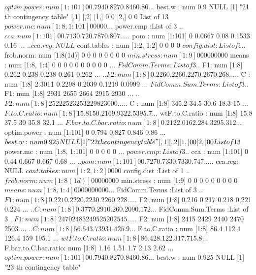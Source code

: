 \documentclass[11pt]{article} %
\begin{document}
\begin{Schunk}
\begin{Soutput}
 $ optim.power         : num [1:101] 0 0.794 0.827 0.846 0.86 ...
 $ best.w              : num 0.9
NULL
[1] "21 th contingency table"
     [,1] [,2]
[1,]    0    0
[2,]    0    0
List of 13
 $ power.mc            : num [1:8, 1:101] 0 0 0 0 0 ...
 $ power.cmp           :List of 3
  ..$ cca    : num [1:101] 0 0.713 0.72 0.787 0.807 ...
  ..$ pom    : num [1:101] 0 0.0667 0.08 0.1533 0.16 ...
  ..$ cca.reg: NULL
 $ cont.tables         : num [1:2, 1:2] 0 0 0 0
 $ config.dist         :List of 1
  ..$ frob.norm: num [1:8(1d)] 0 0 0 0 0 0 0 0
 $ min.stress          : num [1:9] 0 0 0 0 0 0 0 0 0
 $ means               : num [1:8, 1:4] 0 0 0 0 0 0 0 0 0 0 ...
 $ FidComm.Terms       :List of 3
  ..$ F1: num [1:8] 0.262 0.238 0.238 0.261 0.262 ...
  ..$ F2: num [1:8] 0.226 0.226 0.227 0.267 0.268 ...
  ..$ C : num [1:8] 2.3011 0.2298 0.2039 0.1219 0.0999 ...
 $ FidComm.Sum.Terms   :List of 3
  ..$ F1: num [1:8] 2931 2655 2664 2915 2930 ...
  ..$ F2: num [1:8] 2522 2523 2532 2982 3000 ...
  ..$ C : num [1:8] 345.2 34.5 30.6 18.3 15 ...
 $ F.to.C.ratio        : num [1:8] 15.8 150.2 169.9 322.5 395.7 ...
 $ wtF.to.C.ratio      : num [1:8] 15.8 37.5 30 35.8 32.1 ...
 $ F.bar.to.C.bar.ratio: num [1:8] 0.212 2.016 2.28 4.329 5.312 ...
 $ optim.power         : num [1:101] 0 0.794 0.827 0.846 0.86 ...
 $ best.w              : num 0.925
NULL
[1] "22 th contingency table"
     [,1] [,2]
[1,]    0    0
[2,]    0    0
List of 13
 $ power.mc            : num [1:8, 1:101] 0 0 0 0 0 ...
 $ power.cmp           :List of 3
  ..$ cca    : num [1:101] 0 0.44 0.667 0.667 0.68 ...
  ..$ pom    : num [1:101] 0 0.727 0.733 0.733 0.747 ...
  ..$ cca.reg: NULL
 $ cont.tables         : num [1:2, 1:2] 0 0 0 0
 $ config.dist         :List of 1
  ..$ frob.norm: num [1:8(1d)] 0 0 0 0 0 0 0 0
 $ min.stress          : num [1:9] 0 0 0 0 0 0 0 0 0
 $ means               : num [1:8, 1:4] 0 0 0 0 0 0 0 0 0 0 ...
 $ FidComm.Terms       :List of 3
  ..$ F1: num [1:8] 0.221 0.222 0.223 0.226 0.228 ...
  ..$ F2: num [1:8] 0.216 0.217 0.218 0.221 0.224 ...
  ..$ C : num [1:8] 0.377 0.291 0.26 0.209 0.172 ...
 $ FidComm.Sum.Terms   :List of 3
  ..$ F1: num [1:8] 2470 2483 2495 2520 2545 ...
  ..$ F2: num [1:8] 2415 2429 2440 2470 2503 ...
  ..$ C : num [1:8] 56.5 43.7 39 31.4 25.9 ...
 $ F.to.C.ratio        : num [1:8] 86.4 112.4 126.4 159 195.1 ...
 $ wtF.to.C.ratio      : num [1:8] 86.4 28.1 22.3 17.7 15.8 ...
 $ F.bar.to.C.bar.ratio: num [1:8] 1.16 1.51 1.7 2.13 2.62 ...
 $ optim.power         : num [1:101] 0 0.794 0.827 0.846 0.86 ...
 $ best.w              : num 0.925
NULL
[1] "23 th contingency table"

\end{Soutput}
\end{Schunk}
\end{document}
